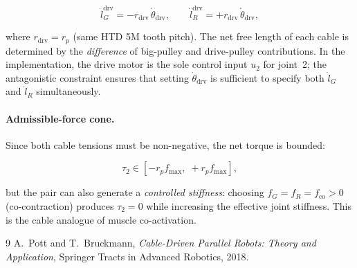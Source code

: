 \documentclass[12pt, a4paper]{article}
\theoremstyle{definition}
\begin{document}
\begin{equation}
  \label{eq:ldot_drive}
  \dot{l}_G^{\mathrm{drv}} = -r_{\mathrm{drv}}\,\dot{\theta}_{\mathrm{drv}},
  \qquad
  \dot{l}_R^{\mathrm{drv}} = +r_{\mathrm{drv}}\,\dot{\theta}_{\mathrm{drv}},
\end{equation}

where $r_{\mathrm{drv}} = r_p$ (same HTD 5M tooth pitch).  The net free length
of each cable is determined by the \emph{difference} of big-pulley and
drive-pulley contributions.  In the implementation, the drive motor is the
sole control input $u_2$ for joint~2; the antagonistic constraint ensures that
setting $\dot{\theta}_{\mathrm{drv}}$ is sufficient to specify both $\dot{l}_G$
and $\dot{l}_R$ simultaneously.

\paragraph{Admissible-force cone.}
Since both cable tensions must be non-negative, the net torque is bounded:

\begin{equation}
  \label{eq:torque_cone}
  \tau_2 \in [-r_p f_{\max},\; +r_p f_{\max}],
\end{equation}

but the pair can also generate a \emph{controlled stiffness}: choosing
$f_G = f_R = f_{\text{co}} > 0$ (co-contraction) produces $\tau_2 = 0$ while
increasing the effective joint stiffness.  This is the cable analogue of
muscle co-activation.

\begin{thebibliography}{9}
  A.~Pott and T.~Bruckmann,
  \textit{Cable-Driven Parallel Robots: Theory and Application},
  Springer Tracts in Advanced Robotics, 2018.
\end{thebibliography}
\end{document}
